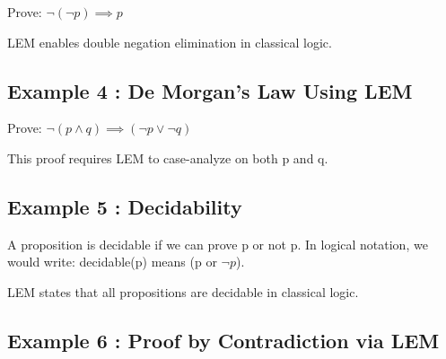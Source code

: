 \documentclass[a4paper,10pt,fleqn]{article}
\begin{document}
\noindent Prove: $\lnot (\lnot p) \implies p$

\bigskip

\begin{center}
\end{center}
\bigskip

\noindent LEM enables double negation elimination in classical logic.

\bigskip

\subsection*{Example 4 : De Morgan's Law Using LEM}

\noindent Prove: $\lnot (p \land q) \implies (\lnot p \lor \lnot q)$

\bigskip

\begin{center}
\end{center}
\bigskip

\noindent This proof requires LEM to case-analyze on both p and q.

\bigskip

\subsection*{Example 5 : Decidability}

\noindent A proposition is decidable if we can prove p or not p. In logical notation, we would write: decidable(p) means (p or $\lnot p$).

\bigskip

\noindent LEM states that all propositions are decidable in classical logic.

\bigskip

\subsection*{Example 6 : Proof by Contradiction via LEM}
\end{document}
